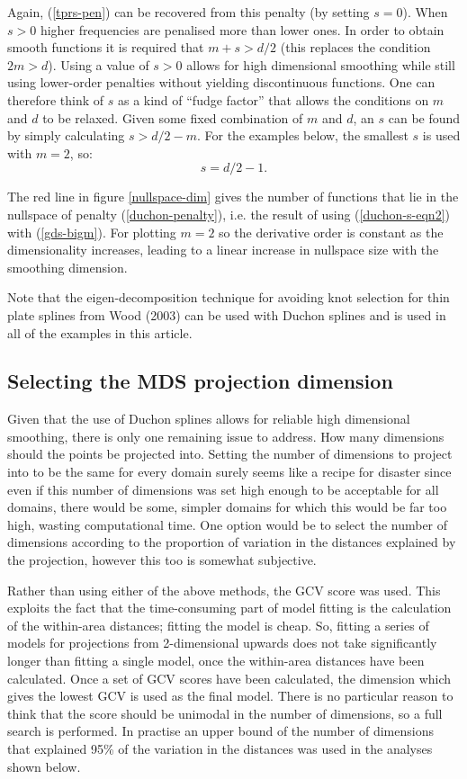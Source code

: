 \documentclass[useAMS,referee, usegraphicx]{biom}
\begin{document}
Again, (\ref{tprs-pen}) can be recovered from this penalty (by setting $s=0$). When $s>0$ higher frequencies are penalised more than lower ones. In order to obtain smooth functions it is required that $m+s>d/2$ (this replaces the condition $2m>d$). Using a value of $s>0$ allows for high dimensional smoothing while still using lower-order penalties without yielding discontinuous functions. One can therefore think of $s$ as a kind of ``fudge factor'' that allows the conditions on $m$ and $d$ to be relaxed. Given some fixed combination of $m$ and $d$, an $s$ can be found by simply calculating $s>d/2-m$. For the examples below, the smallest $s$ is used with $m=2$, so:
\begin{equation}
s=d/2-1.
\label{duchon-s-eqn2}
\end{equation}

The red line in figure \ref{nullspace-dim} gives the number of functions that lie in the nullspace of penalty (\ref{duchon-penalty}), i.e. the result of using (\ref{duchon-s-eqn2}) with (\ref{gds-bigm}). For plotting $m=2$ so the derivative order is constant as the dimensionality increases, leading to a linear increase in nullspace size with the smoothing dimension.

Note that the eigen-decomposition technique for avoiding knot selection for thin plate splines from Wood (2003) can be used with Duchon splines and is used in all of the examples in this article.

\subsection{Selecting the MDS projection dimension}

Given that the use of Duchon splines allows for reliable high dimensional smoothing, there is only one remaining issue to address. How many dimensions should the points be projected into. Setting the number of dimensions to project into to be the same for every domain surely seems like a recipe for disaster since even if this number of dimensions was set high enough to be acceptable for all domains, there would be some, simpler domains for which this would be far too high, wasting computational time. One option would be to select the number of dimensions according to the proportion of variation in the distances explained by the projection, however this too is somewhat subjective.

Rather than using either of the above methods, the GCV score was used. This exploits the fact that the time-consuming part of model fitting is the calculation of the within-area distances; fitting the model is cheap. So, fitting a series of models for projections from 2-dimensional upwards does not take significantly longer than fitting a single model, once the within-area distances have been calculated. Once a set of GCV scores have been calculated, the dimension which gives the lowest GCV is used as the final model. There is no particular reason to think that the score should be unimodal in the number of dimensions, so a full search is performed. In practise an upper bound of the number of dimensions that explained 95\% of the variation in the distances was used in the analyses shown below.
\end{document}
